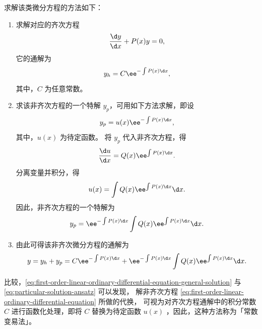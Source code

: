 求解该类微分方程的方法如下：
\begin{enumerate}
    \item 求解对应的齐次方程
          \begin{equation*}
              \frac{\d y}{\d x} + P(x) y = 0 ,
          \end{equation*}
          它的通解为
          \begin{equation}
              y_h = C \ee^{-\int P(x) \d x} \label{eq:first-order-linear-ordinary-differential-equation-general-solution},
          \end{equation}
          其中，$ C $ 为任意常数。
    \item 求该非齐次方程的一个特解 $ y_p $，可用如下方法求解，即设
          \begin{equation}
              y_p = u(x) \ee^{-\int P(x) \d x} \label{eq:particular-solution-ansatz},
          \end{equation}
          其中，$ u(x) $ 为待定函数。
          将 $ y_p $ 代入非齐次方程，得
          \begin{equation*}
              \frac{\d u}{\d x} = Q(x) \ee^{\int P(x) \d x} .
          \end{equation*}
          分离变量并积分，得
          \begin{equation*}
              u(x) = \int Q(x) \ee^{\int P(x) \d x} \d x .
          \end{equation*}
          因此，非齐次方程的一个特解为
          \begin{equation}
              y_p = \ee^{-\int P(x) \d x} \int Q(x) \ee^{\int P(x) \d x} \d x .
          \end{equation}
    \item 由此可得该非齐次微分方程的通解为
          \begin{equation}
              y = y_h + y_p = C \ee^{-\int P(x) \d x} + \ee^{-\int P(x) \d x} \int Q(x) \ee^{\int P(x) \d x} \d x \label{eq:first-order-linear-ordinary-differential-equation-general-solution-nonhomogeneous}.
          \end{equation}
\end{enumerate}

比较，\cref{eq:first-order-linear-ordinary-differential-equation-general-solution} 与 \cref{eq:particular-solution-ansatz} 可以发现，
解非齐次方程 \cref{eq:first-order-linear-ordinary-differential-equation} 所做的代换，
可视为对齐次方程通解中的积分常数 $ C $ 进行函数化处理，即将 $ C $ 替换为待定函数 $ u(x) $ ，因此，这种方法称为「常数变易法」。

